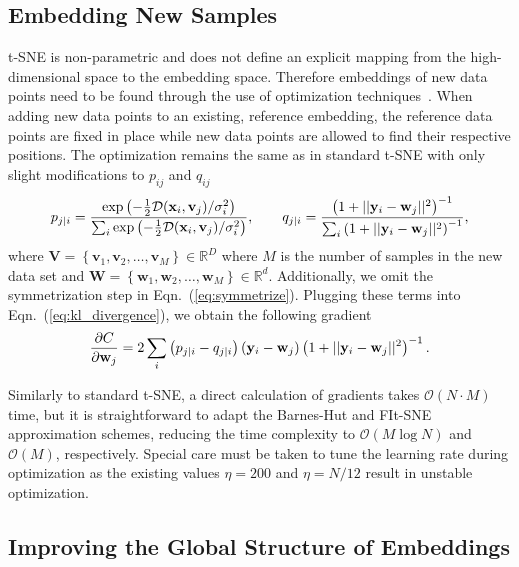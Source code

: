 \documentclass[article]{jss}
\begin{document}
\subsection{Embedding New Samples} \label{sec:meth.transform}

t-SNE is non-parametric and does not define an explicit mapping from the
high-dimensional space to the embedding space. Therefore embeddings of new data
points need to be found through the use of optimization
techniques~\citep{policar2019embedding}. When adding new data points to an
existing, reference embedding, the reference data points are fixed in place
while new data points are allowed to find their respective positions. The
optimization remains the same as in standard t-SNE with only slight
modifications to $p_{ij}$ and $q_{ij}$
\begin{align}
p_{j \mid i} = \frac{\exp \left ( -\frac{1}{2} \mathcal{D}(\mathbf{x}_i, \mathbf{v}_j) /  \sigma_i^2 \right )}{\sum_{i} \exp \left ( -\frac{1}{2} \mathcal{D}(\mathbf{x}_i, \mathbf{v}_j) / \sigma_i^2 \right )}, \qquad
q_{j \mid i} = \frac{\left ( 1 + || \mathbf{y}_i - \mathbf{w}_j ||^2 \right )^{-1}}{\sum_{i}\left ( 1 + || \mathbf{y}_i - \mathbf{w}_j ||^2 \right )^{-1}}, \notag
\end{align}
\noindent where $\mathbf{V} = \left \{ \mathbf{v}_1, \mathbf{v}_2, \dots,
\mathbf{v}_M \right \} \in \mathbb{R}^D$ where $M$ is the number of samples in
the new data set and $\mathbf{W} = \left \{ \mathbf{w}_1, \mathbf{w}_2, \dots,
\mathbf{w}_M \right \} \in \mathbb{R}^d$. Additionally, we omit the
symmetrization step in Eqn.~(\ref{eq:symmetrize}). Plugging these terms into
Eqn.~(\ref{eq:kl_divergence}), we obtain the following gradient
\begin{equation}
\frac{\partial C}{\partial \mathbf{w}_j} = 2 \sum_i \left ( p_{j \mid i} - q_{j \mid i} \right ) \left ( \mathbf{y}_i - \mathbf{w}_j \right ) \left ( 1 + || \mathbf{y}_i - \mathbf{w}_j || ^2 \right )^{-1}. \notag
\label{eq:gradient}
\end{equation}

Similarly to standard t-SNE, a direct calculation of gradients takes
$\mathcal{O}(N \cdot M)$ time, but it is straightforward to adapt the Barnes-Hut
and FIt-SNE approximation schemes, reducing the time complexity to
$\mathcal{O}(M \log N)$ and $\mathcal{O}(M)$, respectively. Special care must be
taken to tune the learning rate during optimization as the existing values
$\eta=200$ and $\eta=N/12$ result in unstable optimization.


\subsection{Improving the Global Structure of Embeddings} \label{sec:meth.global}
\end{document}
